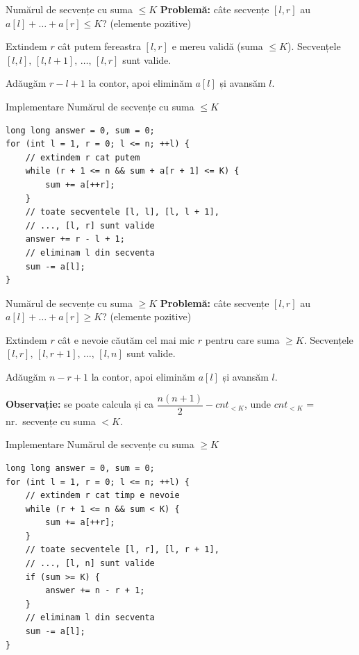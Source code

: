 \documentclass{beamer}
\begin{document}
\begin{frame}{Numărul de secvențe cu suma $\leq K$}
  \textbf{Problemă:} câte secvențe $[l, r]$ au $a[l] + \ldots + a[r] \leq K$? (elemente pozitive)

  \smallskip
  Extindem $r$ cât putem \textemdash{} fereastra $[l, r]$ e mereu validă (suma $\leq K$).
  Secvențele $[l, l],\, [l, l{+}1],\, \ldots,\, [l, r]$ sunt valide.

  \smallskip
  Adăugăm $r - l + 1$ la contor, apoi eliminăm $a[l]$ și avansăm $l$.
\end{frame}

\begin{frame}[fragile]{Implementare \textemdash{} Numărul de secvențe cu suma $\leq K$}
  \begin{lstlisting}
long long answer = 0, sum = 0;
for (int l = 1, r = 0; l <= n; ++l) {
    // extindem r cat putem
    while (r + 1 <= n && sum + a[r + 1] <= K) {
        sum += a[++r];
    }
    // toate secventele [l, l], [l, l + 1],
    // ..., [l, r] sunt valide
    answer += r - l + 1;
    // eliminam l din secventa
    sum -= a[l];
}
  \end{lstlisting}
\end{frame}

\begin{frame}{Numărul de secvențe cu suma $\geq K$}
  \textbf{Problemă:} câte secvențe $[l, r]$ au $a[l] + \ldots + a[r] \geq K$? (elemente pozitive)

  \smallskip
  Extindem $r$ cât e nevoie \textemdash{} căutăm cel mai mic $r$ pentru care suma $\geq K$.
  Secvențele $[l, r],\, [l, r{+}1],\, \ldots,\, [l, n]$ sunt valide.

  \smallskip
  Adăugăm $n - r + 1$ la contor, apoi eliminăm $a[l]$ și avansăm $l$.

  \smallskip
  \textbf{Observație:} se poate calcula și ca $\dfrac{n(n+1)}{2} - cnt_{< K}$, unde $cnt_{< K}$ = nr.\ secvențe cu suma $< K$.
\end{frame}

\begin{frame}[fragile]{Implementare \textemdash{} Numărul de secvențe cu suma $\geq K$}
  \begin{lstlisting}
long long answer = 0, sum = 0;
for (int l = 1, r = 0; l <= n; ++l) {
    // extindem r cat timp e nevoie
    while (r + 1 <= n && sum < K) {
        sum += a[++r];
    }
    // toate secventele [l, r], [l, r + 1],
    // ..., [l, n] sunt valide
    if (sum >= K) {
        answer += n - r + 1;
    }
    // eliminam l din secventa
    sum -= a[l];
}
  \end{lstlisting}
\end{frame}
\end{document}
